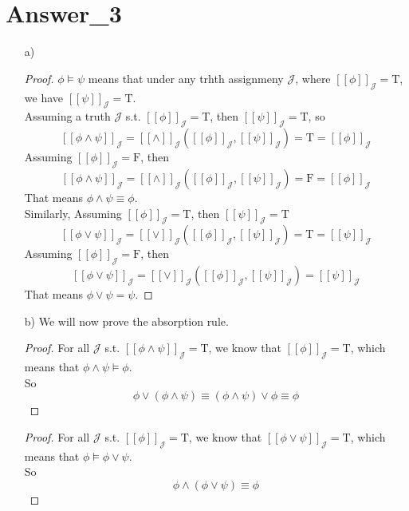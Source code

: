 \documentclass{article}
\begin{document}
\section{Answer\_3}

\begin{itemize}
    \item[a)]
        \begin{proof}
            $\phi \models \psi$ means that under any trhth assignmeny $\mathcal{J}$, where $[\![\phi]\!]_\mathcal{J} = \text{T}$, \\
            we have $[\![\psi]\!]_\mathcal{J} = \text{T}$. \\
            Assuming a truth $\mathcal{J}$ s.t. $[\![\phi]\!]_\mathcal{J} = \text{T}$, then $[\![\psi]\!]_\mathcal{J} = \text{T}$, so 
            $$ [\![\phi \land \psi]\!]_\mathcal{J} = [\![\land]\!]_\mathcal{J}([\![\phi]\!]_\mathcal{J}, [\![\psi]\!]_\mathcal{J}) = \text{T} = [\![\phi]\!]_\mathcal{J}$$
            Assuming $[\![\phi]\!]_\mathcal{J} = \text{F}$, then
            $$ [\![\phi \land \psi]\!]_\mathcal{J} = [\![\land]\!]_\mathcal{J}([\![\phi]\!]_\mathcal{J}, [\![\psi]\!]_\mathcal{J}) = \text{F} = [\![\phi]\!]_\mathcal{J}$$
            That means $\phi \land \psi \equiv \phi$.
            \\
            Similarly,
            Assuming $[\![\phi]\!]_\mathcal{J} = \text{T}$, then $[\![\psi]\!]_\mathcal{J} = \text{T}$
            $$ [\![\phi \lor \psi]\!]_\mathcal{J} = [\![\lor]\!]_\mathcal{J}([\![\phi]\!]_\mathcal{J}, [\![\psi]\!]_\mathcal{J}) = \text{T} = [\![\psi]\!]_\mathcal{J}$$
            Assuming $[\![\phi]\!]_\mathcal{J} = \text{F}$, then
            $$ [\![\phi \lor \psi]\!]_\mathcal{J} = [\![\lor]\!]_\mathcal{J}([\![\phi]\!]_\mathcal{J}, [\![\psi]\!]_\mathcal{J})  = [\![\psi]\!]_\mathcal{J}$$
            That means $\phi \lor \psi = \psi$.
            \qedhere
        \end{proof}
    \item[b)]
        We will now prove the absorption rule.
        \begin{proof}
            For all $\mathcal{J}$ s.t. $[\![\phi \land \psi]\!]_\mathcal{J} = \text{T}$, we know that $[\![\phi]\!]_\mathcal{J} = \text{T}$, which means that $\phi \land \psi \models \phi$. \\
            So $$ \phi \lor (\phi \land \psi) \equiv (\phi \land \psi) \lor \phi \equiv \phi $$
            \qedhere
        \end{proof}
        \begin{proof}
            For all $\mathcal{J}$ s.t. $[\![\phi]\!]_\mathcal{J} = \text{T}$, we know that $[\![\phi \lor \psi]\!]_\mathcal{J} = \text{T}$, which means that $\phi \models \phi \lor \psi$. \\
            So $$ \phi \land (\phi \lor \psi) \equiv \phi $$
            \qedhere
        \end{proof}
\end{itemize}
\end{document}
